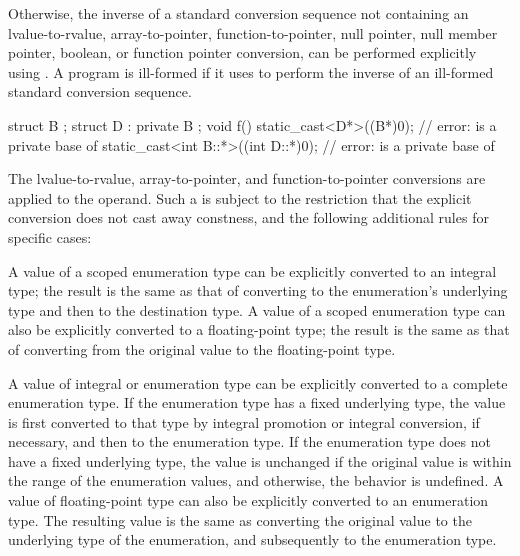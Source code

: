 \pnum
Otherwise,
the inverse of a standard conversion sequence not containing an
lvalue-to-rvalue,
array-to-pointer,
function-to-pointer,
null pointer, null member pointer,
boolean, or
function pointer
conversion, can be performed explicitly using . A
program is ill-formed if it uses  to perform the
inverse of an ill-formed standard conversion sequence.
\begin{example}
\begin{codeblock}
struct B { };
struct D : private B { };
void f() {
  static_cast<D*>((B*)0);               // error:  is a private base of 
  static_cast<int B::*>((int D::*)0);   // error:  is a private base of 
}
\end{codeblock}
\end{example}

\pnum
The lvalue-to-rvalue,
array-to-pointer, and
function-to-pointer conversions are applied to the
operand. Such a  is subject to the restriction that
the explicit conversion does not cast away
constness, and the following additional rules
for specific cases:

\pnum
A value of a scoped enumeration type
can be explicitly converted to an integral type;
the result is the same as that of converting
to the enumeration's underlying type and then to the destination type.
A value of a scoped enumeration type
can also be explicitly converted to a floating-point type;
the result is the same as that of converting
from the original value to the floating-point type.

\pnum
{}%
%
A value of integral or enumeration type can be explicitly converted to
a complete enumeration type.
If the enumeration type has a fixed underlying type,
the value is first converted to that type
by
integral promotion or integral conversion,
if necessary, and
then to the enumeration type.
If the enumeration type does not have a fixed underlying type,
the value is unchanged
if the original value is within the range
of the enumeration values, and
otherwise, the behavior is undefined.
A value of floating-point type can also be explicitly converted to an enumeration type.
The resulting value is the same as converting the original value to the
underlying type of the enumeration, and subsequently to
the enumeration type.

